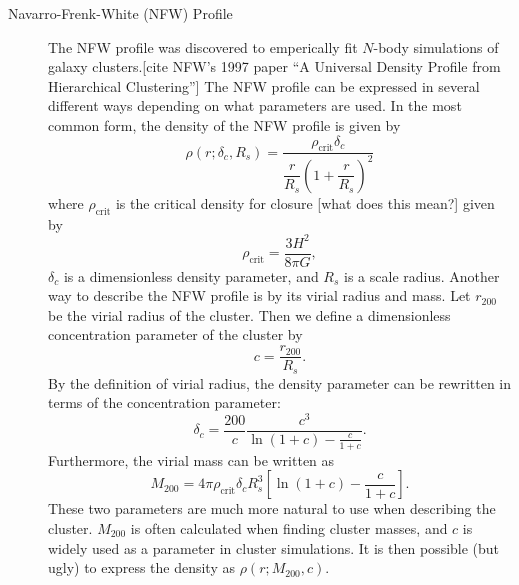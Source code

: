 \documentclass[10pt,twoside]{article}
\theoremstyle{definition}
\theoremstyle{exercise}
\begin{document}
\begin{description}
  \item[Navarro-Frenk-White (NFW) Profile] The NFW profile was discovered to emperically fit $N$-body simulations of galaxy clusters.[cite NFW's 1997 paper ``A Universal Density Profile from Hierarchical Clustering''] The NFW profile can be expressed in several different ways depending on what parameters are used. In the most common form, the density of the NFW profile is given by
    \begin{equation}
      \rho(r; \delta_c, R_s) = \frac{\rho_\text{crit}\delta_c}{\dfrac{r}{R_s}\left( 1+\dfrac{r}{R_s} \right)^2}
      \label{eq:NFW_density}
    \end{equation}
    where $\rho_\text{crit}$ is the critical density for closure [what does this mean?] given by
    \begin{equation}
      \rho_\text{crit} = \frac{3H^2}{8\pi G},
      \label{eq:rho_crit}
    \end{equation}
    $\delta_c$ is a dimensionless density parameter, and $R_s$ is a scale radius. Another way to describe the NFW profile is by its virial radius and mass. Let $r_{200}$ be the virial radius of the cluster. Then we define a dimensionless concentration parameter of the cluster by
    \begin{equation}
      c = \frac{r_{200}}{R_s}.
      \label{eq:concentration_parameter}
    \end{equation}
By the definition of virial radius, the density parameter can be rewritten in terms of the concentration parameter:
    \begin{equation}
      \delta_c = \frac{200}{c} \frac{c^3}{\ln(1+c)-\frac{c}{1+c}}.     
      \label{eq:delta_c}
    \end{equation}
Furthermore, the virial mass can be written as
\begin{equation}
  M_{200} = 4\pi\rho_\text{crit}\delta_cR_s^3\left[ \ln(1+c) - \frac{c}{1+c} \right].
  \label{eq:virial_mass}
\end{equation}
    These two parameters are much more natural to use when describing the cluster. $M_{200}$ is often calculated when finding cluster masses, and $c$ is widely used as a parameter in cluster simulations. It is then possible (but ugly) to express the density as $\rho(r; M_{200}, c)$.


\end{description}
\end{document}
